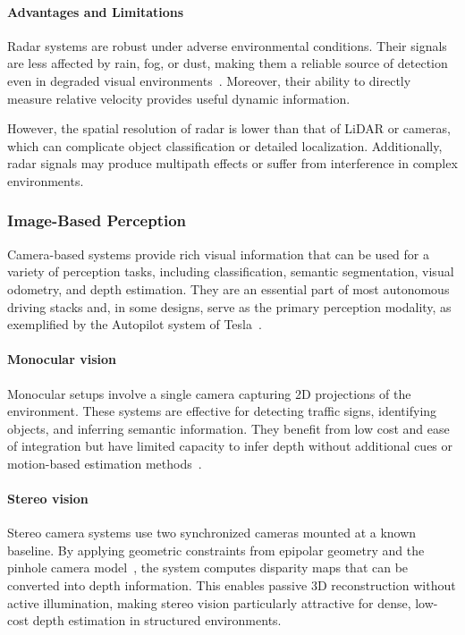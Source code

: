 \paragraph{Advantages and Limitations}

Radar systems are robust under adverse environmental conditions. Their signals are less affected 
by rain, fog, or dust, making them a reliable source of detection even in degraded visual 
environments~\cite{autonomous_vehicles_perception_survey, radarbased_weather}. Moreover, 
their ability to directly measure relative velocity provides useful dynamic information. 

However, the spatial resolution of radar is lower than that of LiDAR or cameras, which can 
complicate object classification or detailed localization. Additionally, radar signals may 
produce multipath effects or suffer from interference in complex environments.

\subsubsection{Image-Based Perception}

Camera-based systems provide rich visual information that can be used for a variety of 
perception tasks, including classification, semantic segmentation, visual odometry, and depth estimation.
They are an essential part of most autonomous driving stacks and, in some designs, serve as the 
primary perception modality, as exemplified by the Autopilot system of Tesla~\cite{tesla_autopilot}.

\paragraph{Monocular vision}

Monocular setups involve a single camera capturing 2D projections of the environment. These systems 
are effective for detecting traffic signs, identifying objects, and inferring semantic information. 
They benefit from low cost and ease of integration but have limited capacity to infer depth without 
additional cues or motion-based estimation methods~\cite{autonomous_vehicles_perception_survey}.

\paragraph{Stereo vision}

Stereo camera systems use two synchronized cameras mounted at a known baseline. By applying geometric 
constraints from epipolar geometry and the pinhole camera model~\cite{pin_hole_camera_model}, the 
system computes disparity maps that can be converted into depth information. This enables passive 
3D reconstruction without active illumination, making stereo vision particularly attractive for 
dense, low-cost depth estimation in structured environments.

